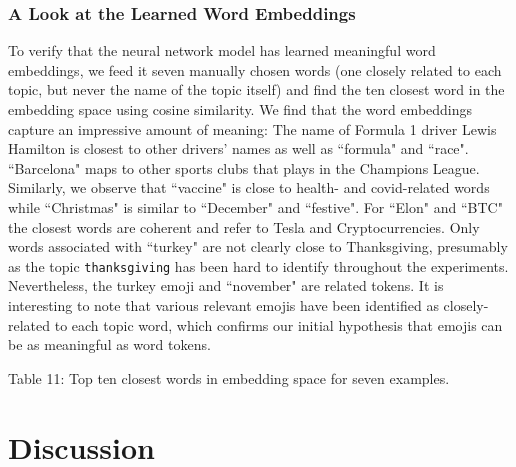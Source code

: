 \documentclass[11pt]{article}
\begin{document}
\subsubsection{A Look at the Learned Word Embeddings}
To verify that the neural network model has learned meaningful word embeddings, we feed it seven manually chosen words (one closely related to each topic, but never the name of the topic itself) and find the ten closest word in the embedding space using cosine similarity. We find that the word embeddings capture an impressive amount of meaning: The name of Formula 1 driver Lewis Hamilton is closest to other drivers' names as well as ``formula" and ``race". ``Barcelona" maps to other sports clubs that plays in the Champions League. Similarly,  we observe that ``vaccine" is close to health- and covid-related words while ``Christmas" is similar to ``December" and ``festive". For ``Elon" and ``BTC" the closest words are coherent and refer to Tesla and Cryptocurrencies. Only words associated with ``turkey" are not clearly close to Thanksgiving, presumably as the topic \texttt{thanksgiving} has been hard to identify throughout the experiments. Nevertheless, the turkey emoji and ``november" are related tokens. It is interesting to note that various relevant emojis have been identified as closely-related to each topic word, which confirms our initial hypothesis that emojis can be as meaningful as word tokens.
\\

\begin{adjustbox}{width=\columnwidth,center}

\end{adjustbox}
\begin{center}
	Table 11: Top ten closest words in embedding space for seven examples.
\end{center}


\section{Discussion}
\end{document}
